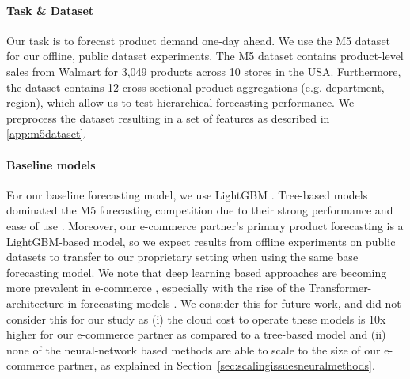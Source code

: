 \documentclass[preprint, 3p, times, twocolumn]{elsarticle}
\begin{document}
  \paragraph{Task \& Dataset} Our task is to forecast product demand one-day ahead. We use the M5 dataset \cite{makridakis_m5_2021} for our offline, public dataset experiments. The M5 dataset contains product-level sales from Walmart for 3,049 products across 10 stores in the USA. Furthermore, the dataset contains 12 cross-sectional product aggregations (e.g. department, region), which allow us to test hierarchical forecasting performance. We preprocess the dataset resulting in a set of features as described in \ref{app:m5dataset}.
  
  \paragraph{Baseline models} For our baseline forecasting model, we use LightGBM \cite{ke_lightgbm_2017}. Tree-based models dominated the M5 forecasting competition due to their strong performance and ease of use \cite{makridakis_m5_2022,januschowski_forecasting_2022}. Moreover, our e-commerce partner's primary product forecasting is a LightGBM-based model, so we expect results from offline experiments on public datasets to transfer to our proprietary setting when using the same base forecasting model. We note that deep learning based approaches are becoming more prevalent in e-commerce \cite{kunz_deep_2023}, especially with the rise of the Transformer-architecture in forecasting models \cite{lim_temporal_2021,li_enhancing_2019}. We consider this for future work, and did not consider this for our study as (i) the cloud cost to operate these models is 10x higher for our e-commerce partner as compared to a tree-based model and (ii) none of the neural-network based methods are able to scale to the size of our e-commerce partner, as explained in Section~\ref{sec:scalingissuesneuralmethods}.
\end{document}

